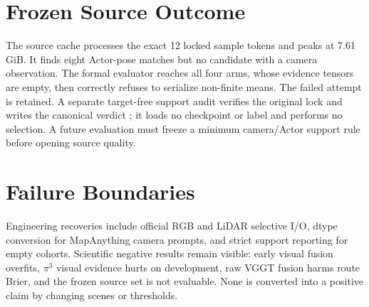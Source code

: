 \documentclass[10pt,twocolumn,letterpaper]{article}
\begin{document}
\section{Frozen Source Outcome}
The source cache processes the exact 12 locked sample tokens and peaks at 7.61 GiB. It
finds eight Actor-pose matches but no candidate with a camera observation. The formal
evaluator reaches all four arms, whose evidence tensors are empty, then correctly
refuses to serialize non-finite means. The failed attempt is retained. A separate
target-free support audit verifies the original lock and writes the canonical verdict
; it loads no
checkpoint or label and performs no selection. A future evaluation must freeze a
minimum camera/Actor support rule before opening source quality.

\section{Failure Boundaries}
Engineering recoveries include official RGB and LiDAR selective I/O, dtype conversion
for MapAnything camera prompts, and strict support reporting for empty cohorts. Scientific
negative results remain visible: early visual fusion overfits, $\pi^3$ visual evidence
hurts on development, raw VGGT fusion harms route Brier, and the frozen source set is
not evaluable. None is converted into a positive claim by changing scenes or thresholds.
\end{document}
